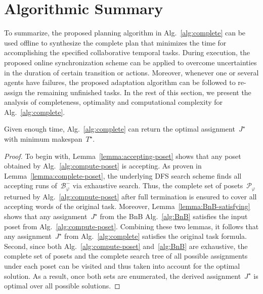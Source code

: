 \section{Algorithmic Summary}\label{subsec:summary}

To summarize, the proposed planning algorithm in Alg.~\ref{alg:complete}
can be used offline to synthesize the complete plan that
minimizes the time for accomplishing the specified collaborative temporal tasks.
During execution, the proposed online synchronization scheme can be applied to
overcome uncertainties in the duration of certain transition or actions.
Moreover, whenever one or several agents have failures, the proposed adaptation
algorithm can be followed to re-assign the remaining unfinished tasks.
In the rest of this section,
we present the analysis of completeness, optimality and computational
complexity for Alg.~\ref{alg:complete}.

\begin{theorem}[Completeness]\label{theo:completeness}
Given enough time, Alg.~\ref{alg:complete} can return the optimal
assignment~$J^\star$ with minimum makespan~$T^\star$.
\end{theorem}
\begin{proof}
 To begin with, Lemma~\ref{lemma:accepting-poset} shows that any poset obtained
 by Alg.~\ref{alg:compute-poset} is accepting.
 As proven in Lemma~\ref{lemma:complete-poset},
 the underlying DFS search scheme finds all accepting runs of~$\mathcal{B}^-_{\varphi}$ via exhaustive search.
 Thus, the complete set of posets~$\mathcal{P}_{\varphi}$ returned by
 Alg.~\ref{alg:compute-poset} after full termination is ensured to cover all
 accepting words of the original task.
 Moreover, Lemma~\ref{lemma:BnB-satisfying} shows that any assignment~$J^\star$
 from the BnB Alg.~\ref{alg:BnB} satisfies the input poset
 from Alg.~\ref{alg:compute-poset}.
 Combining these two lemmas, it follows that any assignment~$J^\star$
 from Alg.~\ref{alg:complete} satisfies the original task formula.
 Second, since both Alg.~\ref{alg:compute-poset} and~\ref{alg:BnB} are exhaustive,
 the complete set of posets and the complete search tree of all
 possible assignments under each poset can be visited and thus taken into account
 for the optimal solution.
 As a result, once both sets are enumerated, the derived assignment~$J^\star$ is
 optimal over all possible solutions.
\end{proof}

